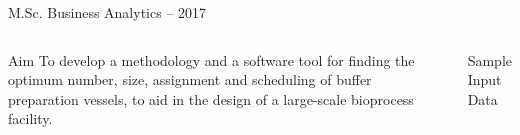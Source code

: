 \documentclass[final]{beamer}
\begin{document}
\begin{frame}[t]
\begin{columns}
            \huge{M.Sc. Business Analytics -- 2017}
        \end{columns}
        
        \vspace{0.3cm}
        
        \huge
        \begin{columns}[t]
                \begin{block}{\huge Aim}
                    To develop a methodology and a software tool for finding
                    the optimum number, size, assignment and scheduling of
                    buffer preparation vessels, to aid in the design of a
                    large-scale bioprocess facility.
                \end{block}
                \begin{block}{\huge Sample Input Data}


\end{block}
\end{columns}
\end{frame}
\end{document}
